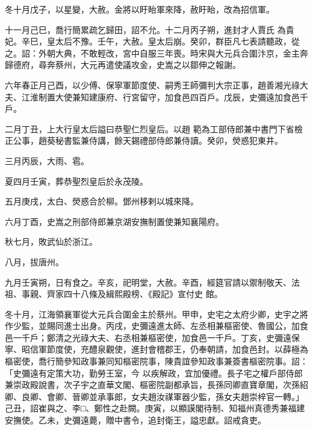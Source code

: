 \begin{pinyinscope}
 冬十月戊子，以星變，大赦。金將以盱眙軍來降，赦盱眙，改為招信軍。



 十一月己巳，喬行簡累疏乞歸田，詔不允。十二月丙子朔，進封才人賈氏
 為貴妃。辛巳，皇太后不豫。壬午，大赦。皇太后崩。癸卯，群臣凡七表請聽政，從之。詔：外朝大典，不敢輕改，宮中自服三年喪。時宋與大元兵合圍汴京，金主奔歸德府，尋奔蔡州，大元再遣使議攻金，史嵩之以鄒伸之報謝。



 六年春正月己酉，以少傅、保寧軍節度使、嗣秀王師彌判大宗正事，趙善湘光祿大夫、江淮制置大使兼知建康府、行宮留守，加食邑四百戶。戊辰，史彌遠加食邑千戶。



 二月丁丑，上大行皇太后謚曰恭聖仁烈皇后。以趙
 範為工部侍郎兼中書門下省檢正公事，趙葵秘書監兼侍講，餘天錫禮部侍郎兼侍讀。癸卯，熒惑犯東井。



 三月丙辰，大雨、雹。



 夏四月壬寅，葬恭聖烈皇后於永茂陵。



 五月庚戌，太白、熒惑合於柳。鄧州移剌以城來降。



 六月丁酉，史嵩之刑部侍郎兼京湖安撫制置使兼知襄陽府。



 秋七月，敗武仙於浙江。



 八月，拔唐州。



 九月壬寅朔，日有食之。辛亥，祀明堂，大赦。辛酉，經筵官請以禦制敬天、法祖、事親、齊家四十八條及緝熙殿榜、《殿記》宣付史
 館。



 冬十月，江海領襄軍從大元兵合圍金主於蔡州。甲申，史宅之太府少卿，史宇之將作少監，並賜同進士出身。丙戌，史彌遠進太師、左丞相兼樞密使、魯國公，加食邑一千戶；鄭清之光祿大夫、右丞相兼樞密使，加食邑一千戶。丁亥，史彌遠保寧、昭信軍節度使，充醴泉觀使，進封會稽郡王，仍奉朝請，加食邑封。以薛極為樞密使，喬行簡參知政事兼同知樞密院事，陳貴誼參知政事兼簽書樞密院事。詔：「史彌遠有定策大功，勤勞王室，今
 以疾解政，宜加優禮。長子宅之權戶部侍郎兼崇政殿說書，次子宇之直華文閣、樞密院副都承旨，長孫同卿直寶章閣，次孫紹卿、良卿、會卿、晉卿並承事郎，女夫趙汝禖軍器少監，孫女夫趙崇梓官一轉。」己丑，詔崔與之、李□、鄭性之赴闕。庚寅，以顯謨閣待制、知福州真德秀兼福建安撫使。乙未，史彌遠薨，贈中書令，追封衛王，謚忠獻。詔戒貪吏。




\end{pinyinscope}
